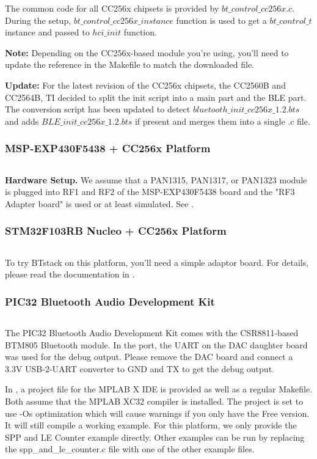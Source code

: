 The common code for all CC256x chipsets is provided by $bt\_control\_cc256x.c$. During the setup, $bt\_control\_cc256x\_instance$ function is used to get  a $bt\_control\_t$ instance and passed to $hci\_init$ function. 

 \textbf{Note:} Depending on the CC256x-based module you're using, you'll need to update the reference  in the Makefile to match the downloaded file.

 \textbf{Update:} For the latest revision of the CC256x chipsets, the CC2560B and CC2564B, TI decided to split the init script into a main part and the BLE part. The conversion script has been updated to detect $bluetooth\_init\_cc256x\_1.2.bts$ and adds $BLE\_init\_cc256x\_1.2.bts$ if present and merges them into a single .c file.

\subsubsection{MSP-EXP430F5438 + CC256x Platform}
\label{platform:msp430}
$ $

\textbf{Hardware Setup.} We assume that a PAN1315, PAN1317, or PAN1323 module is plugged into RF1 and RF2 of the MSP-EXP430F5438 board and the "RF3 Adapter board" is used or at least simulated. See \UserGuide{}. 

\subsubsection{STM32F103RB Nucleo + CC256x Platform}
$ $

To try BTstack on this platform, you'll need a simple adaptor board. For details, please read the documentation in .

\subsubsection{PIC32 Bluetooth Audio Development Kit}
$ $

The PIC32 Bluetooth Audio Development Kit comes with the CSR8811-based BTM805 Bluetooth module. In the port, the UART on the DAC daughter board was used for the debug output. Please remove the DAC board and connect a 3.3V USB-2-UART converter to GND and TX to get the debug output.

In , a project file for the MPLAB X IDE is provided as well as a regular Makefile. Both assume that the MPLAB XC32 compiler is installed. The project is set to use -Os optimization which will cause warnings if you only have the Free version. It will still compile a working example. For this platform, we only provide the SPP and LE Counter example directly. Other examples can be run by replacing the spp\_and\_le\_counter.c file with one of the other example files.

